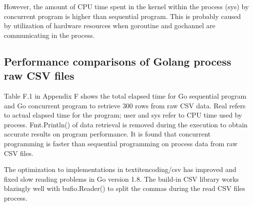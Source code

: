 However, the amount of CPU time spent in the kernel within the process (sys) by concurrent program is higher than sequential program. This is probably caused by utilization of hardware resources when goroutine and gochannel are communicating in the process. 

\subsection{Performance comparisons of Golang process raw CSV files}

Table F.1 in Appendix F shows the total elapsed time for Go sequential program and Go concurrent program to retrieve 300 rows from raw CSV data. Real refers to actual elapsed time for the program; user and sys refer to CPU time used by process. Fmt.Println() of data retrieval is removed during the execution to obtain accurate results on program performance. It is found that concurrent programming is faster than sequential programming on process data from raw CSV files. 

 The optimization to implementations in textit{encoding/csv} has improved \cite{go1.8-changelog} and fixed slow reading problems in Go version 1.8. The build-in CSV library works blazingly well with bufio.Reader() to split the commas during the read CSV files process. 











